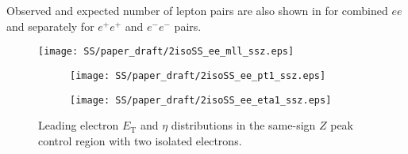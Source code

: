Observed and expected number of lepton pairs are also shown in  for combined $ee$ and separately for $e^{+}e^{+}$ and $e^{-}e^{-}$ pairs.

\begin{figure}[h]
\begin{center}
\texttt{[image: SS/paper\_draft/2isoSS\_ee\_mll\_ssz.eps]}
\caption{\toDo}
\label{fig:charge_flip_CR_inv_mass}
\end{center}
\end{figure} 

\begin{figure}
\begin{subfigure}{.5\textwidth}
  \centering
  \texttt{[image: SS/paper\_draft/2isoSS\_ee\_pt1\_ssz.eps]}
\end{subfigure}%
\begin{subfigure}{.5\textwidth}
  \centering
  \texttt{[image: SS/paper\_draft/2isoSS\_ee\_eta1\_ssz.eps]}
\end{subfigure}
\caption{\toDo Leading electron $E_\mathrm{T}$ and $\eta$ distributions in the same-sign $Z$ peak control region with two isolated electrons.}
  \label{fig:charge_flip_CR_kinematics}
\end{figure}



